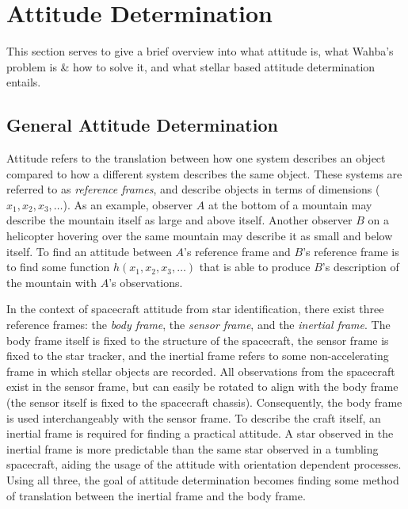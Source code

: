 \newcommand{\iFrame}{\mathcal{I}}
\newcommand{\kFrame}{\mathcal{K}}
\newcommand{\vv}[1]{#1} %

\section{Attitude Determination}\label{sec:attitudeDetermination}

This section serves to give a brief overview into what attitude is, what Wahba's problem is \& how to solve it, and what
stellar based attitude determination entails.

\subsection{General Attitude Determination}\label{subsec:generalAttitudeDetermination}
Attitude refers to the translation between how one system describes an object compared to how a different system
describes the same object.
These systems are referred to as \textit{reference frames}, and describe objects in terms of dimensions ($x_1, x_2, x_3,
\ldots$).
As an example, observer $A$ at the bottom of a mountain may describe the mountain itself as large and above itself.
Another observer $B$ on a helicopter hovering over the same mountain may describe it as small and below itself.
To find an attitude between $A$'s reference frame and $B$'s reference frame is to find some function $h(x_1, x_2, x_3,
\ldots)$ that is able to produce $B$'s description of the mountain with $A$'s observations.

In the context of spacecraft attitude from star identification, there exist three reference frames: the
\textit{body frame}, the \textit{sensor frame}, and the \textit{inertial frame}.
The body frame itself is fixed to the structure of the spacecraft, the sensor frame is fixed to the star tracker,
and the inertial frame refers to some non-accelerating frame in which stellar objects are recorded.
All observations from the spacecraft exist in the sensor frame, but can easily be rotated to align with the body frame
(the sensor itself is fixed to the spacecraft chassis).
Consequently, the body frame is used interchangeably with the sensor frame.
To describe the craft itself, an inertial frame is required for finding a practical attitude.
A star observed in the inertial frame is more predictable than the same star observed in a tumbling spacecraft, aiding
the usage of the attitude with orientation dependent processes.
Using all three, the goal of attitude determination becomes finding some method of translation between the inertial
frame and the body frame.

